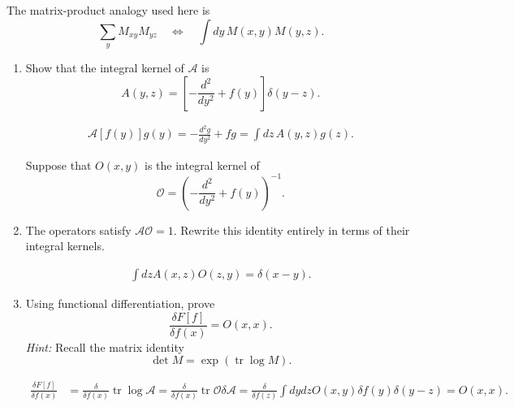 The matrix-product analogy used here is
\begin{equation}
    \sum_y M_{xy}M_{yz}
    \quad\Longleftrightarrow\quad
    \int dy\,M(x,y)M(y,z).
\end{equation}

\begin{enumerate}[label=\alph*)]
    \item Show that the integral kernel of $\mathcal A$ is
    \begin{equation}
        A(y,z)
        =\left[-\frac{d^2}{dy^2}+f(y)\right]\delta(y-z).
    \end{equation}
    \begin{solution}
        \begin{equation}
            \begin{aligned}
                \mathcal{A}[f(y)]g(y) = -\frac{d^2g}{dy^2} + fg = \int dz \, A(y,z) g(z).
            \end{aligned}
        \end{equation}
    \end{solution}

    Suppose that $O(x,y)$ is the integral kernel of
    \begin{equation}
        \mathcal O
        =\left(-\frac{d^2}{dy^2}+f(y)\right)^{-1}.
    \end{equation}

    \item The operators satisfy $\mathcal A\mathcal O=1$. Rewrite this identity
    entirely in terms of their integral kernels.
    \begin{solution}
        \begin{equation}
            \begin{aligned}
                \int dz A(x,z)O(z,y) = \delta(x-y).
            \end{aligned}
        \end{equation}
    \end{solution}

    \item Using functional differentiation, prove
    \begin{equation}
        \frac{\delta F[f]}{\delta f(x)}=O(x,x).
    \end{equation}
    \textit{Hint:} Recall the matrix identity
    \begin{equation}
        \det M=\exp(\operatorname{tr}\log M).
    \end{equation}
    \begin{solution}
        \begin{equation}
            \begin{aligned}
                \frac{\delta F[f]}{\delta f(x)} &= \frac{\delta}{\delta f(x)} \operatorname{tr} \log \mathcal{A} = \frac{\delta}{\delta f(x)}\operatorname{tr} \mathcal{O} \delta\mathcal{A}= \frac{\delta}{\delta f(z)} \int dydz O(x,y)\delta f(y) \delta(y-z) =O(x,x).
            \end{aligned}
        \end{equation}
    \end{solution}


\end{enumerate}
